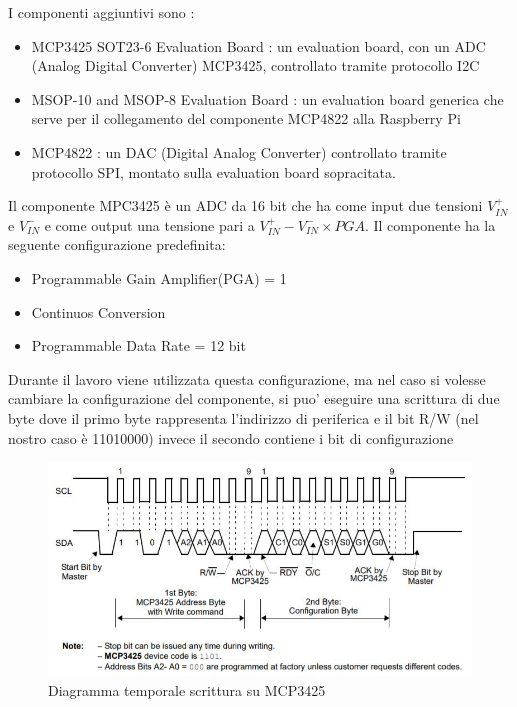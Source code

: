 \documentclass[12pt, a4paper, titlepage, oneside]{book}
\begin{document}
\begin{flushleft}
I componenti aggiuntivi sono :
\begin{itemize}
    \item MCP3425 SOT23-6 Evaluation Board  \cite{microchipMCP3425}: un evaluation board, con un ADC (Analog Digital Converter) MCP3425, controllato tramite protocollo I2C
    \item MSOP-10 and MSOP-8 Evaluation Board \cite{microchipMSOP10-8}: un evaluation board generica che serve per il collegamento del componente MCP4822 alla Raspberry Pi
    \item MCP4822 \cite{microchipMCP4822}: un DAC (Digital Analog Converter) controllato tramite protocollo SPI, montato sulla evaluation board sopracitata.
\end{itemize}
\newpage
Il componente MPC3425 è un ADC da 16 bit che ha come input due tensioni $V_{IN}^+ $ e $ V_{IN}^-$ e come output una tensione pari a $V_{IN}^+ - V_{IN}^- \times PGA$. Il componente ha la seguente configurazione predefinita:
\begin{itemize}
    \item Programmable Gain Amplifier(PGA) = 1
    \item Continuos Conversion
    \item Programmable Data Rate = 12 bit
\end{itemize}
Durante il lavoro viene utilizzata questa configurazione, ma nel caso si volesse cambiare la configurazione del componente, si puo' eseguire una scrittura di due byte dove il primo byte rappresenta l'indirizzo di periferica e il bit R/W (nel nostro caso è 11010000) invece il secondo contiene i bit di configurazione\\
\begin{figure}[h]
    \centering
    \includegraphics{wrtie_configuration_MCP3425.JPG}
    \caption{Diagramma temporale scrittura su MCP3425}
    \label{fig:my_label4}
\end{figure}

\end{flushleft}
\end{document}
